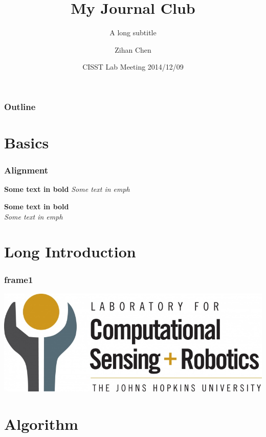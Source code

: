 \documentclass[12pt]{beamer}
\title[Journal Club]{My Journal Club}
\subtitle[short subtitle]{A long subtitle}
\date[2014]{CISST Lab Meeting 2014/12/09}
\author[Zihan Chen]{Zihan Chen}
\institute[JHU]{Johns Hopkins University}
\begin{document}
\begin{frame}
  \titlepage
\end{frame}


\begin{frame}
  \frametitle{Outline}
  \tableofcontents
\end{frame}  


\section{Basics}

\begin{frame}
  \frametitle{Alignment}
  \begin{center}
    \textbf{Some text in bold}
    \emph{Some text in emph}
  \end{center}
  
  \textbf{Some text in bold} \\
  \vskip10pt
  \emph{Some text in emph}
  
\end{frame}


\section{Long Introduction}
\begin{frame}
  \frametitle{frame1}
  \includegraphics[width=\textwidth]{figs/logo-LCSR-800px.jpg}
\end{frame}

\section{Algorithm}
\end{document}
